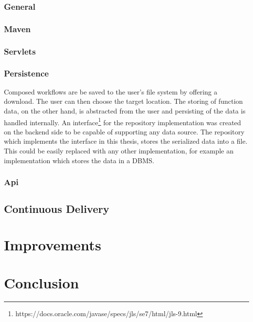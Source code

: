 \documentclass[a4paper,11pt,pdftex,halfparskip,cleardoubleempty,bibtotoc,liststotoc]{scrbook}
\begin{document}
\subsection{General}
\subsection{Maven}
\subsection{Servlets}
\subsection{Persistence}
\label{Backend-Persistence}

Composed workflows are be saved to the user's file system by offering a download. The user can then choose the target location.
The storing of function data, on the other hand, is abstracted from the user and persisting of the data is handled internally.
An interface\footnote{https://docs.oracle.com/javase/specs/jls/se7/html/jls-9.html} for the repository implementation was created on the backend side to be capable of supporting any data source. The repository which implements the interface in this thesis, stores the serialized data into a file. This could be easily replaced with any other implementation, for example an implementation which stores the data in a DBMS.

\subsection{Api}


\section{Continuous Delivery}

\chapter{Improvements}

\chapter{Conclusion}


\nocite{*}



\end{document}
